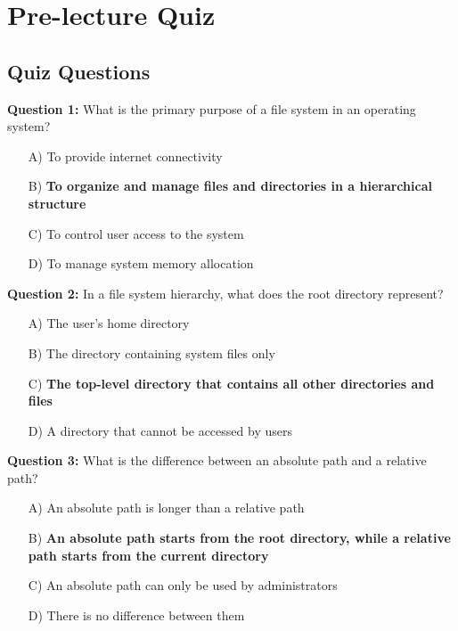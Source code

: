 \section{Pre-lecture Quiz}
\label{sec:data-files:pre-quiz}

\subsection{Quiz Questions}

\textbf{Question 1:} What is the primary purpose of a file system in an operating system?

\begin{enumerate}
    \item[A)] To provide internet connectivity
    \item[B)] \textbf{To organize and manage files and directories in a hierarchical structure}
    \item[C)] To control user access to the system
    \item[D)] To manage system memory allocation
\end{enumerate}

\textbf{Question 2:} In a file system hierarchy, what does the root directory represent?

\begin{enumerate}
    \item[A)] The user's home directory
    \item[B)] The directory containing system files only
    \item[C)] \textbf{The top-level directory that contains all other directories and files}
    \item[D)] A directory that cannot be accessed by users
\end{enumerate}

\textbf{Question 3:} What is the difference between an absolute path and a relative path?

\begin{enumerate}
    \item[A)] An absolute path is longer than a relative path
    \item[B)] \textbf{An absolute path starts from the root directory, while a relative path starts from the current directory}
    \item[C)] An absolute path can only be used by administrators
    \item[D)] There is no difference between them
\end{enumerate}

